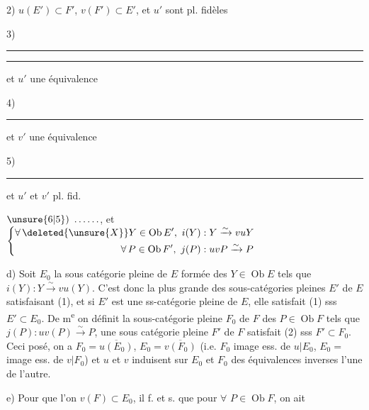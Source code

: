 2) $u(E')\subset F'$, $v(F')\subset E'$, et $u'$  sont pl. fidèles

3) \rule{1.1em}{.4pt}\quad\rule{2.1em}{.4pt}\quad et $u'$ une équivalence

4) \rule{3.8em}{.4pt}\quad et $v'$ une équivalence

5) \rule{3.8em}{.4pt}\quad et $u'$ et $v'$ pl. fid.

$\unsure{6|5})\ \ldots\ldots$, et $\left\{\begin{aligned}
\forall\,\deleted{\unsure{X}}Y\in\operatorname{Ob}E',\ i(Y)&:Y\xrightarrow{\sim}vuY\\
\forall\,P\in\operatorname{Ob}F',\ j(P)&:uvP\xrightarrow{\sim}P
\end{aligned}\right.$


d)  Soit $E_0$ \deleted{\unsure{=}} la sous catégorie  pleine de $E$ formée des $Y\in\operatorname{Ob}E$ tels que $i(Y):Y\xrightarrow{\sim}vu(Y)$. C'est donc la plus grande des sous-catégories pleines $E'$ de $E$ satisfaisant (1), et si $E'$ est une ss-catégorie pleine de $E$, elle satisfait (1) sss $E'\subset E_0$. De m\textsuperscript{e} on définit la sous-catégorie  pleine $F_0$ de $F$  des  $P\in\operatorname{Ob}F$ tels que $j(P):uv(P)\xrightarrow{\sim}P$, une sous catégorie pleine $F'$ de $F$ satisfait (2) sss $F'\subset F_0$. Ceci posé, on a $F_0=\overline{u(E_0)}$, $E_0=\overline{v(F_0)}$ (i.e. $F_0$\inserted{$=$} image ess. de $u|E_0$, $E_0=$ image ess. de $v|F_0$) et $u$ et $v$ induisent sur $E_0$ et $F_0$ des équivalences inverses l'une de l'autre.

e) Pour que  l'on  $v(F)\subset E_0$, il f. et s. que pour $\forall$  $P\in\operatorname{Ob}F$, on ait 



